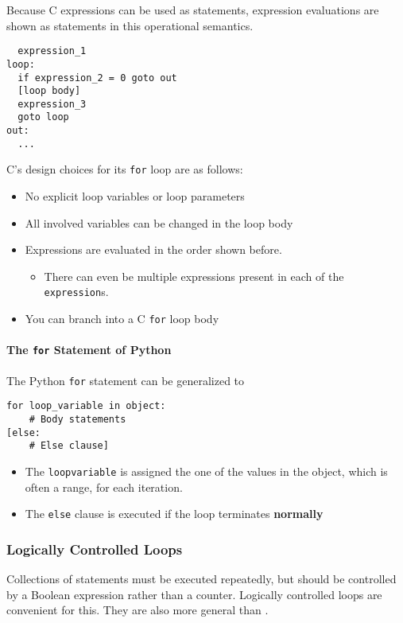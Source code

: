 Because C expressions can be used as statements, expression evaluations are shown as statements in this operational semantics.
\begin{verbatim}
  expression_1
loop:
  if expression_2 = 0 goto out
  [loop body]
  expression_3
  goto loop
out:
  ...
\end{verbatim}

C's design choices for its \texttt{for} loop are as follows:
\begin{itemize}[noitemsep]
\item No explicit loop variables or loop parameters
\item All involved variables can be changed in the loop body
\item Expressions are evaluated in the order shown before.
  \begin{itemize}[noitemsep]
  \item There can even be multiple expressions present in each of the \texttt{expression}s.
  \end{itemize}
\item You can branch into a C \texttt{for} loop body
\end{itemize}

\paragraph{The \texttt{for} Statement of Python}\label{par:Counter_Controlled_Loops-Python}
The Python \texttt{for} statement can be generalized to
\begin{verbatim}
for loop_variable in object:
    # Body statements
[else:
    # Else clause]
\end{verbatim}

\begin{itemize}[noitemsep]
\item The \texttt{loop\textunderscore{}variable} is assigned the one of the values in the object, which is often a range, for each iteration.
\item The \texttt{else} clause is executed if the loop terminates \textbf{normally}
\end{itemize}

\subsubsection{Logically Controlled Loops}\label{subsubsec:Logically_Controlled_Loops}
Collections of statements must be executed repeatedly, but should be controlled by a Boolean expression rather than a counter.
Logically controlled loops are convenient for this.
They are also more general than .

